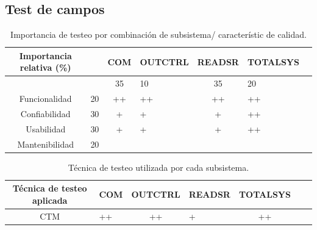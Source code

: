 \documentclass[11pt]{article}
\begin{document}
\subsection{Test de campos}
\FloatBarrier
\begin{table}[!ht]
    \centering
    \begin{tabularx}{\linewidth}{@{}|c|X|c|X|c|X|c|@{}}\hline \hline
        \rowcolor[HTML]{d6c6c3}
        Importancia relativa (\%) &    & COM & OUTCTRL & READSR & TOTALSYS \\
        \hline

                                  &    & 35  & 10      & 35     & 20       \\
        Funcionalidad             & 20 & ++  & ++      & ++     & ++       \\
        Confiabilidad             & 30 & +   & +       & +      & ++       \\
        Usabilidad                & 30 & +   & +       & +      & ++       \\
        Mantenibilidad            & 20 &     &         &        &          \\
        \hline
    \end{tabularx}
    \caption{Importancia de testeo por combinación de subsistema/ característic
        de calidad.}
\end{table}

\FloatBarrier
\begin{table}[!ht]
    \centering
    \begin{tabularx}{\linewidth}{@{}|c|X|c|X|c|X|c|@{}}\hline \hline
        \rowcolor[HTML]{d6c6c3}
        Técnica de testeo aplicada & COM & OUTCTRL & READSR & TOTALSYS \\
        \hline
        CTM                        & ++  & ++      & +      & ++       \\
        \hline
    \end{tabularx}
    \caption{Técnica de testeo utilizada por cada subsistema.}
\end{table}
\end{document}
